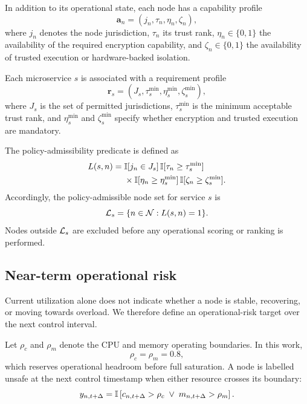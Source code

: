 In addition to its operational state, each node has a capability profile
\begin{equation}
\label{eq:node-capability}
    \mathbf{a}_n
    =
    \left(
        j_n,\tau_n,\eta_n,\zeta_n
    \right),
\end{equation}
where $j_n$ denotes the node jurisdiction, $\tau_n$ its trust rank,
$\eta_n\in\{0,1\}$ the availability of the required encryption
capability, and $\zeta_n\in\{0,1\}$ the availability of trusted execution
or hardware-backed isolation.

Each microservice $s$ is associated with a requirement profile
\begin{equation}
\label{eq:service-requirement}
    \mathbf{r}_s
    =
    \left(
        J_s,
        \tau_s^{\min},
        \eta_s^{\min},
        \zeta_s^{\min}
    \right),
\end{equation}
where $J_s$ is the set of permitted jurisdictions,
$\tau_s^{\min}$ is the minimum acceptable trust rank, and
$\eta_s^{\min}$ and $\zeta_s^{\min}$ specify whether encryption and
trusted execution are mandatory.

The policy-admissibility predicate is defined as
\begin{equation}
\label{eq:legal}
\begin{split}
    L(s,n)
    ={}&
    \mathbb{I}[j_n\in J_s]\,
    \mathbb{I}[\tau_n\geq\tau_s^{\min}]\\
    &{}\times
    \mathbb{I}[\eta_n\geq\eta_s^{\min}]\,
    \mathbb{I}[\zeta_n\geq\zeta_s^{\min}].
\end{split}
\end{equation}
Accordingly, the policy-admissible node set for service $s$ is
\begin{equation}
\label{eq:legal-set}
    \mathcal{L}_s
    =
    \{n\in\mathcal{N}:L(s,n)=1\}.
\end{equation}
Nodes outside $\mathcal{L}_s$ are excluded before any operational scoring or
ranking is performed.

\subsection{Near-term operational risk}

Current utilization alone does not indicate whether a node is stable,
recovering, or moving towards overload. We therefore define an
operational-risk target over the next control interval.

Let $\rho_c$ and $\rho_m$ denote the CPU and memory operating
boundaries. In this work,
\begin{equation}
    \rho_c=\rho_m=0.8,
\end{equation}
which reserves operational headroom before full saturation. A node is
labelled unsafe at the next control timestamp when either resource
crosses its boundary:
\begin{equation}
\label{eq:unsafe}
    y_{n,t+\Delta}
    =
    \mathbb{I}
    \left[
        c_{n,t+\Delta}>\rho_c
        \;\lor\;
        m_{n,t+\Delta}>\rho_m
    \right].
\end{equation}

